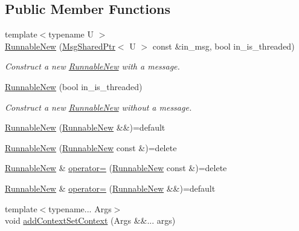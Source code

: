 \subsection*{Public Member Functions}
\begin{DoxyCompactItemize}
\item 
{\footnotesize template$<$typename U $>$ }\\\hyperlink{structvt_1_1runnable_1_1_runnable_new_a47b84af69a5444b9d837a3ffe4d4792b}{Runnable\+New} (\hyperlink{namespacevt_ab2b3d506ec8e8d1540aede826d84a239}{Msg\+Shared\+Ptr}$<$ U $>$ const \&in\+\_\+msg, bool in\+\_\+is\+\_\+threaded)
\begin{DoxyCompactList}\small\item\em Construct a new {\ttfamily \hyperlink{structvt_1_1runnable_1_1_runnable_new}{Runnable\+New}} with a message. \end{DoxyCompactList}\item 
\hyperlink{structvt_1_1runnable_1_1_runnable_new_a55ff785753c781903bf932a1e5faddd7}{Runnable\+New} (bool in\+\_\+is\+\_\+threaded)
\begin{DoxyCompactList}\small\item\em Construct a new {\ttfamily \hyperlink{structvt_1_1runnable_1_1_runnable_new}{Runnable\+New}} without a message. \end{DoxyCompactList}\item 
\hyperlink{structvt_1_1runnable_1_1_runnable_new_ac7e1d836710c2d0cd2791f1a1c5ac03c}{Runnable\+New} (\hyperlink{structvt_1_1runnable_1_1_runnable_new}{Runnable\+New} \&\&)=default
\item 
\hyperlink{structvt_1_1runnable_1_1_runnable_new_a4c34cf076ffd914c3d18aca7d2ff28db}{Runnable\+New} (\hyperlink{structvt_1_1runnable_1_1_runnable_new}{Runnable\+New} const \&)=delete
\item 
\hyperlink{structvt_1_1runnable_1_1_runnable_new}{Runnable\+New} \& \hyperlink{structvt_1_1runnable_1_1_runnable_new_a12c7ddbd735a9bf704b06ecea7c26e60}{operator=} (\hyperlink{structvt_1_1runnable_1_1_runnable_new}{Runnable\+New} const \&)=delete
\item 
\hyperlink{structvt_1_1runnable_1_1_runnable_new}{Runnable\+New} \& \hyperlink{structvt_1_1runnable_1_1_runnable_new_a3561cbcbc3197074cded8da204e98924}{operator=} (\hyperlink{structvt_1_1runnable_1_1_runnable_new}{Runnable\+New} \&\&)=default
\item 
{\footnotesize template$<$typename... Args$>$ }\\void \hyperlink{structvt_1_1runnable_1_1_runnable_new_a37c77d1949cd1590b74d286814bed1ef}{add\+Context\+Set\+Context} (Args \&\&... args)

\end{DoxyCompactItemize}

